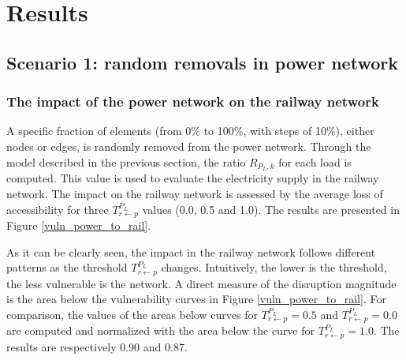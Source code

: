 \documentclass[review]{elsarticle}
\begin{document}
	
	\section{Results}
	\subsection{Scenario 1: random removals in power network}
	\subsubsection{The impact of the power network on the railway network}
	
	A specific fraction of elements (from 0\% to 100\%, with steps of 10\%), either nodes or edges, is randomly removed from the power network. Through the model described in the previous section, the ratio $R_{P_L,k}$ for each load is computed. This value is used to evaluate the electricity supply in the railway network. The impact on the railway network is assessed by the average loss of accessibility for three $T_{r \leftarrow p}^{P_L}$ values (0.0, 0.5 and 1.0). The results are presented in Figure \ref{vuln_power_to_rail}.
	
	As it can be clearly seen, the impact in the railway network follows different patterns as the threshold $T_{r \leftarrow p}^{P_L}$ changes. Intuitively, the lower is the threshold, the less vulnerable is the network. A direct measure of the disruption magnitude is the area below the vulnerability curves in Figure \ref{vuln_power_to_rail}. For comparison, the values of the areas below curves for $T_{r \leftarrow p}^{P_L}=0.5$ and $T_{r \leftarrow p}^{P_L}=0.0$ are computed and normalized with the area below the curve for $T_{r \leftarrow p}^{P_L}=1.0$. The results are respectively 0.90 and 0.87.
	
\end{document}
